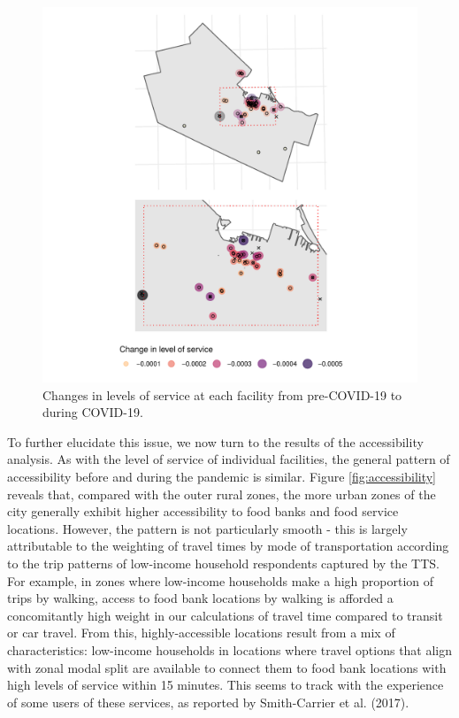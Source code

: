 \documentclass[]{elsarticle} %
\begin{document}
\begin{figure}
\includegraphics[width=1\linewidth]{Accessibility-Foodbanks-Hamilton-V0_files/figure-latex/plot-levels-of-service-changes-1} \caption{\label{fig:levels-of-service-changes}Changes in levels of service at each facility from pre-COVID-19 to during COVID-19.}\label{fig:plot-levels-of-service-changes}
\end{figure}

To further elucidate this issue, we now turn to the results of the
accessibility analysis. As with the level of service of individual
facilities, the general pattern of accessibility before and during the
pandemic is similar. Figure \ref{fig:accessibility} reveals that,
compared with the outer rural zones, the more urban zones of the city
generally exhibit higher accessibility to food banks and food service
locations. However, the pattern is not particularly smooth - this is
largely attributable to the weighting of travel times by mode of
transportation according to the trip patterns of low-income household
respondents captured by the TTS. For example, in zones where low-income
households make a high proportion of trips by walking, access to food
bank locations by walking is afforded a concomitantly high weight in our
calculations of travel time compared to transit or car travel. From
this, highly-accessible locations result from a mix of characteristics:
low-income households in locations where travel options that align with
zonal modal split are available to connect them to food bank locations
with high levels of service within 15 minutes. This seems to track with
the experience of some users of these services, as reported by
Smith-Carrier et al. (2017).
\end{document}
